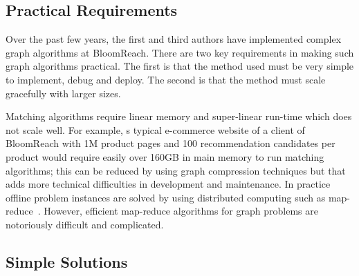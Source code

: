 \subsection{Practical Requirements}

Over the past few years, the first and
third authors have implemented complex graph algorithms at
BloomReach. There are two key requirements in making such graph algorithms
practical. The first is that the method used must be very simple to
implement, debug and deploy. The second is that the method must scale
gracefully with larger sizes. \vs

Matching algorithms require linear memory and super-linear run-time
which does not scale well. For example, s typical
e-commerce website of a client of BloomReach with 1M product pages and 100 recommendation candidates per
product would require easily over 160GB in main memory to run matching
algorithms; this can be reduced by using graph compression techniques but that adds more technical difficulties in development and maintenance. In practice offline problem instances are solved by using distributed computing such as map-reduce~\cite{DeanGhemawat2004}. However, efficient map-reduce algorithms for graph problems are notoriously difficult and complicated. \vs

\subsection{Simple Solutions}

